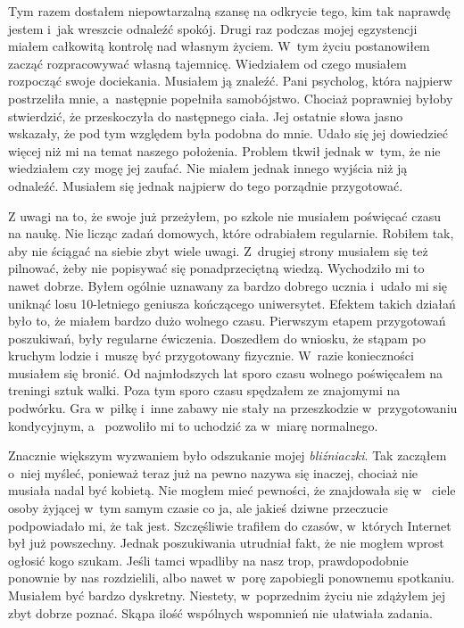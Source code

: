 Tym razem dostałem niepowtarzalną szansę na odkrycie tego, kim tak naprawdę jestem i~jak wreszcie odnaleźć spokój. 
Drugi raz podczas mojej egzystencji miałem całkowitą kontrolę nad własnym życiem. W~tym życiu postanowiłem zacząć 
rozpracowywać własną tajemnicę. Wiedziałem od czego musiałem rozpocząć swoje dociekania. Musiałem ją znaleźć. Pani 
psycholog, która najpierw postrzeliła mnie, a~następnie popełniła samobójstwo. Chociaż poprawniej byłoby stwierdzić, 
że przeskoczyła do następnego ciała. Jej ostatnie słowa jasno wskazały, że pod tym względem była podobna do mnie. 
Udało się jej dowiedzieć więcej niż mi na temat naszego położenia. Problem tkwił jednak w~tym, że nie wiedziałem czy 
mogę jej zaufać. Nie miałem jednak innego wyjścia niż ją odnaleźć. Musiałem się jednak najpierw do tego porządnie 
przygotować. 

Z uwagi na to, że swoje już przeżyłem, po szkole nie musiałem poświęcać czasu na naukę. Nie licząc zadań domowych, 
które odrabiałem regularnie. Robiłem tak, aby nie ściągać na siebie zbyt wiele uwagi. Z~drugiej strony musiałem się 
też pilnować, żeby nie popisywać się ponadprzeciętną wiedzą. Wychodziło mi to nawet dobrze. Byłem ogólnie uznawany za 
bardzo dobrego ucznia i~udało mi się uniknąć losu 10-letniego geniusza kończącego uniwersytet. Efektem takich działań 
było to, że miałem bardzo dużo wolnego czasu. Pierwszym etapem przygotowań poszukiwań, były regularne ćwiczenia. 
Doszedłem do wniosku, że stąpam po kruchym lodzie i~muszę być przygotowany fizycznie. W~razie konieczności musiałem 
się bronić. Od najmłodszych lat sporo czasu wolnego poświęcałem na treningi sztuk walki. Poza tym sporo czasu 
spędzałem ze znajomymi na podwórku. Gra w~piłkę i~inne zabawy nie stały na przeszkodzie w~przygotowaniu kondycyjnym, a
~pozwoliło mi to uchodzić za w~miarę normalnego. 

Znacznie większym wyzwaniem było odszukanie mojej \emph{bliźniaczki}. Tak zacząłem o~niej myśleć, ponieważ teraz już 
na pewno nazywa się inaczej, chociaż nie musiała nadal być kobietą. Nie mogłem mieć pewności, że znajdowała się w~
ciele osoby żyjącej w~tym samym czasie co ja, ale jakieś dziwne przeczucie podpowiadało mi, że tak jest. Szczęśliwie 
trafiłem do czasów, w~których Internet był już powszechny. Jednak poszukiwania utrudniał fakt, że nie mogłem wprost 
ogłosić kogo szukam. Jeśli tamci wpadliby na nasz trop, prawdopodobnie ponownie by nas rozdzielili, albo nawet w~porę 
zapobiegli ponownemu spotkaniu. Musiałem być bardzo dyskretny. Niestety, w~poprzednim życiu nie zdążyłem jej zbyt 
dobrze poznać. Skąpa ilość wspólnych wspomnień nie ułatwiała zadania. 

